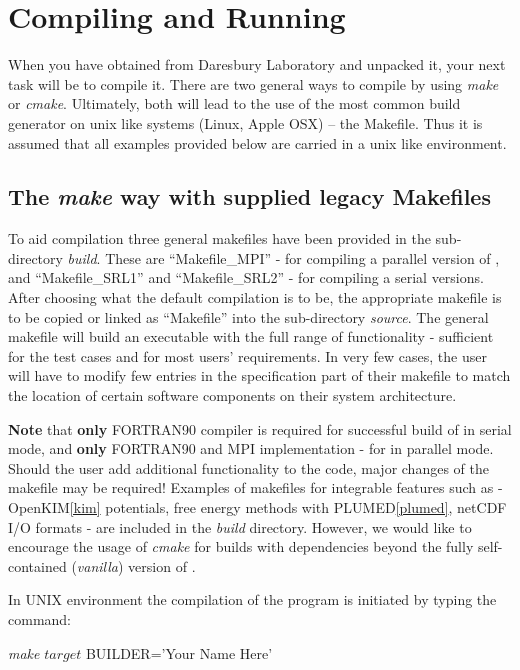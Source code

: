 \section{Compiling and Running \D}
\label{compilation}

When you have obtained \D from Daresbury Laboratory and unpacked it,
your next task will be to compile it.  There are two general ways to
compile \D by using {\sl make} or {\sl cmake}.  Ultimately, both will
lead to the use of the most common build generator on unix like systems
(Linux, Apple OSX) -- the Makefile.  Thus it is assumed that all
examples provided below are carried in a unix like environment.

\subsection{The {\sl make} way with supplied legacy Makefiles}
\label{make}

To aid compilation three general makefiles have been provided
in the sub-directory {\em build}.  These are ``Makefile\_MPI'' -
for compiling a parallel version of \D, and ``Makefile\_SRL1'' and
``Makefile\_SRL2'' - for compiling a serial versions.  After choosing
what the default compilation is to be, the appropriate makefile is
to be copied or linked as ``Makefile'' into the sub-directory
{\em source}.  The general \D makefile will build an executable with
the full range of functionality - sufficient for the test cases and
for most users' requirements.  In very few cases, the user will have
to modify few entries in the specification part of their makefile to
match the location of certain software components on their system architecture.

{\bf Note} that {\bf only} FORTRAN90 compiler is required for
successful build of \D in serial mode, and {\bf only}
FORTRAN90 and MPI implementation - for \D in
parallel mode.  Should the user add additional functionality to
the code, major changes of the makefile may be required!  Examples
of makefiles for integrable features such as - OpenKIM\ref{kim}
potentials, free energy methods with PLUMED\ref{plumed}, netCDF
I/O formats - are included in the {\em build} directory.  However,
we would like to encourage the usage of {\sl cmake} for builds
with dependencies beyond the fully self-contained ({\em vanilla})
version of \D.

In UNIX environment the compilation of the program is initiated by
typing the command:

{\sl make} $target$ BUILDER='Your Name Here'

